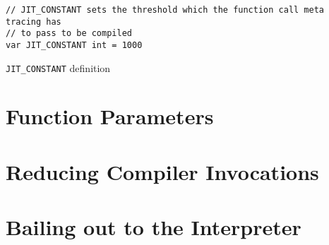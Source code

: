 \begin{listing}[H]
    \begin{verbatim}
// JIT_CONSTANT sets the threshold which the function call meta tracing has
// to pass to be compiled
var JIT_CONSTANT int = 1000
    \end{verbatim}
    \caption{\texttt{JIT\_CONSTANT} definition}
    \label{code:jit-constant}
\end{listing}


\section{Function Parameters}


\section{Reducing Compiler Invocations}


\section{Bailing out to the Interpreter}

